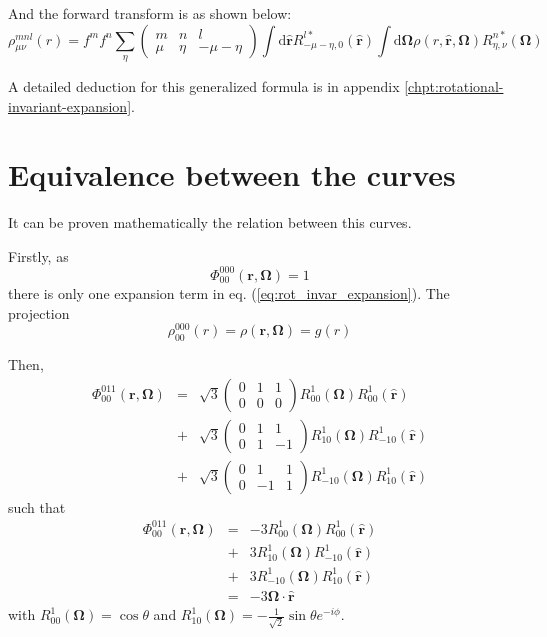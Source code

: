 And the forward transform is as shown below:
\begin{equation}
\rho_{\mu\nu}^{mnl}(r)=f^{m}f^{n}\sum_{\eta}\left(\begin{array}{ccc}
m & n & l\\
\mu & \eta & -\mu-\eta
\end{array}\right)\int\mathrm{d}\hat{\mathbf{r}}R_{-\mu-\eta,0}^{l*}(\mathbf{\hat{r}})\int\mathrm{d}\mathbf{\Omega}\rho(r,\hat{\mathbf{r}},\mathbf{\Omega})R_{\eta,\nu}^{n*}(\mathbf{\Omega})
\end{equation}

A detailed deduction for this generalized formula is in appendix \ref{chpt:rotational-invariant-expansion}.

\section{Equivalence between the curves}

It can be proven mathematically the relation between this curves.

Firstly, as
\begin{equation}
\Phi_{00}^{000}(\mathbf{r},\mathbf{\Omega})=1
\end{equation}
there is only one expansion term in eq. (\ref{eq:rot_invar_expansion}).
The projection
\begin{equation}
\rho_{00}^{000}(r)=\rho(\mathbf{r},\mathbf{\Omega})=g(r)
\end{equation}

Then,
\begin{eqnarray}
\Phi_{00}^{011}(\mathbf{r},\mathbf{\Omega}) & = & \sqrt{3}\left(\begin{array}{ccc}
0 & 1 & 1\\
0 & 0 & 0
\end{array}\right)R_{00}^{1}(\mathbf{\Omega})R_{00}^{1}(\mathbf{\hat{r}})\nonumber \\
 & + & \sqrt{3}\left(\begin{array}{ccc}
0 & 1 & 1\\
0 & 1 & -1
\end{array}\right)R_{10}^{1}(\mathbf{\Omega})R_{-10}^{1}(\mathbf{\hat{r}})\nonumber \\
 & + & \sqrt{3}\left(\begin{array}{ccc}
0 & 1 & 1\\
0 & -1 & 1
\end{array}\right)R_{-10}^{1}(\mathbf{\Omega})R_{10}^{1}(\mathbf{\hat{r}})
\end{eqnarray}
such that
\begin{eqnarray}
\Phi_{00}^{011}(\mathbf{r},\mathbf{\Omega}) & = & -3R_{00}^{1}(\mathbf{\Omega})R_{00}^{1}(\mathbf{\hat{r}})\nonumber \\
 & + & 3R_{10}^{1}(\mathbf{\Omega})R_{-10}^{1}(\mathbf{\hat{r}})\nonumber \\
 & + & 3R_{-10}^{1}(\mathbf{\Omega})R_{10}^{1}(\mathbf{\hat{r}})\\
 & = & -3\mathbf{\Omega}\cdot\hat{\mathbf{r}}
\end{eqnarray}
with $R_{00}^{1}(\mathbf{\Omega})=\cos\theta$ and $R_{10}^{1}(\mathbf{\Omega})=-\frac{1}{\sqrt{2}}\sin\theta e^{-i\phi}$.

